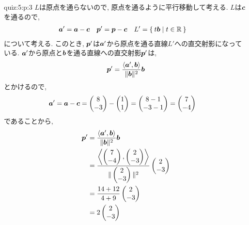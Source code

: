 \begin{answerof}{quiz:5:p:3}
  $L$は原点を通らないので, 原点を通るように平行移動して考える.
  $L$は$\boldsymbol{c}$を通るので,
  \begin{align*}
    \boldsymbol{a}'&=\boldsymbol{a}-\boldsymbol{c}&
    \boldsymbol{p}'&=\boldsymbol{p}-\boldsymbol{c}&
    L'&=\Set{t\boldsymbol{b}|t\in\mathbb{R}}
  \end{align*}
  について考える.
  このとき, $\boldsymbol{p}'$は$\boldsymbol{a}'$から原点を通る直線$L'$への直交射影になっている.
  $\boldsymbol{a}'$から原点と$\boldsymbol{b}$を通る直線への直交射影$\boldsymbol{p}'$は,
  \begin{align*}
    \boldsymbol{p}'=\frac{\Braket{\boldsymbol{a}',\boldsymbol{b}}}{\|\boldsymbol{b}\|^2}\boldsymbol{b}
  \end{align*}
  とかけるので,
  \begin{align*}
    \boldsymbol{a}'&=\boldsymbol{a}-\boldsymbol{c}=\begin{pmatrix}8\\-3\end{pmatrix}-\begin{pmatrix}1\\1\end{pmatrix}
    =\begin{pmatrix}8-1\\-3-1\end{pmatrix}=\begin{pmatrix}7\\-4\end{pmatrix}
  \end{align*}
  であることから,
  \begin{align*}
  \pp'&=\frac{\Braket{\aaa',\bbb}}{\|\bbb\|^2}\bbb\\
  &=\frac{\Braket{\begin{pmatrix}7\\-4\end{pmatrix},\begin{pmatrix}2\\-3\end{pmatrix}}}{\|\begin{pmatrix}2\\-3\end{pmatrix}\|^2}\begin{pmatrix}2\\-3\end{pmatrix}\\
  &=\frac{14+12}{4+9}\begin{pmatrix}2\\-3\end{pmatrix}\\
      &=2\begin{pmatrix}2\\-3\end{pmatrix}\\

\end{align*}
\end{answerof}
